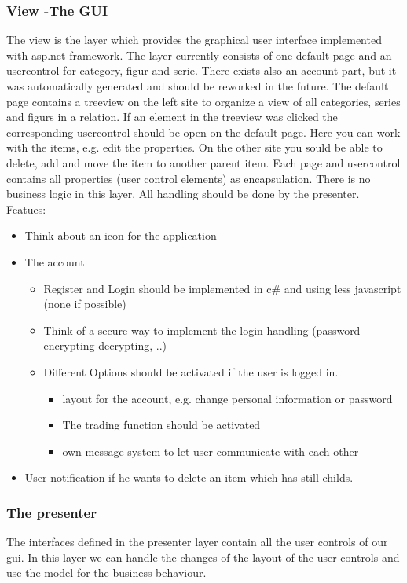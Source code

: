 \documentclass{article}
\begin{document}
\subsubsection{View -The GUI}
The view is the layer which provides the graphical user interface
implemented with asp.net framework.
The layer currently consists of one default page and an usercontrol for
category, figur and serie.
There exists also an account part, but it was automatically generated and should
be reworked in the future.
The default page contains a treeview on the left site to organize a view of all
categories, series and figurs in a relation.
If an element in the treeview was clicked the corresponding usercontrol should
be open on the default page.
Here you can work with the items, e.g. edit the properties. On the other site
you sould be able to delete, add and move the item to another parent item.
\newline
Each page and usercontrol contains all properties (user control elements) as
encapsulation. There is no business logic in this layer. All handling should be
done by the presenter.
\newline
Featues:
\begin{itemize}
  \item Think about an icon for the application
  \item The account
  \begin{itemize}
    \item Register and Login should be implemented in c\# and using less
    javascript (none if possible)
    \item Think of a secure way to implement the login handling
    (password-encrypting-decrypting, ..)
    \item Different Options should be activated if the user is logged in.
    \begin{itemize}
      \item layout for the account, e.g. change personal information or
      password
      \item The trading function should be activated
      \item own message system to let user communicate with each other
    \end{itemize}
  \end{itemize}
  \item User notification if he wants to delete an item which has still childs.
\end{itemize}

\subsubsection{The presenter}
The interfaces defined in the presenter layer contain all the user controls of
our gui. In this layer we can handle the changes of the layout of the user
controls and use the model for the business behaviour.
\end{document}

